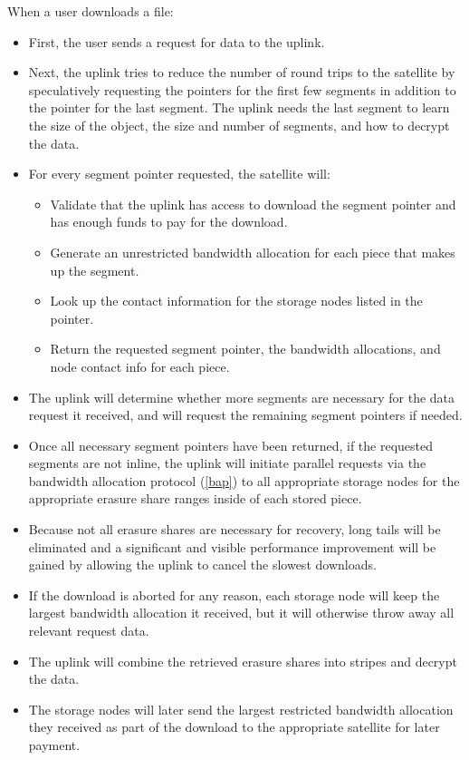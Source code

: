 \documentclass[11pt,fleqn,openany]{book}
\begin{document}
When a user downloads a file:

\begin{itemize}
\item First, the user sends a request for data to the uplink.
\item Next, the uplink tries to reduce the number of round trips to the satellite
  by speculatively requesting the pointers for the first few segments in
  addition to the pointer for the last segment. The uplink needs the last
  segment to learn the size of the object, the size and number of segments,
  and how to decrypt the data.
\item For every segment pointer requested, the satellite will:
  \begin{itemize}
  \item Validate that the uplink has access to download the segment pointer
    and has enough funds to pay for the download.
  \item Generate an unrestricted bandwidth allocation for each piece that
    makes up the segment.
  \item Look up the contact information for the storage nodes listed in the
  pointer.
  \item Return the requested segment pointer, the bandwidth allocations, and
    node contact info for each piece.
  \end{itemize}
\item The uplink will determine whether more segments are necessary for the
  data request it received, and will request the remaining segment pointers if needed.
\item Once all necessary segment pointers have been returned, if the requested
  segments are not inline, the uplink will initiate parallel requests
  via the bandwidth allocation protocol (\ref{bap}) to all appropriate storage
  nodes for the appropriate erasure share ranges inside of each stored piece.
\item Because not all erasure shares are necessary for recovery, long tails
  will be eliminated and a significant and visible performance improvement will
  be gained by allowing the uplink to cancel the slowest downloads.
\item If the download is aborted for any reason, each storage node will keep the
  largest bandwidth allocation it received, but it will otherwise throw away all
  relevant request data.
\item The uplink will combine the retrieved erasure shares into stripes and
  decrypt the data.
\item The storage nodes will later send the largest restricted
  bandwidth allocation they received as part of the download to the appropriate
  satellite for later payment.
\end{itemize}
\end{document}
